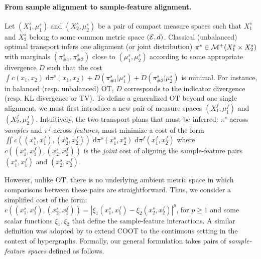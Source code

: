 \paragraph{From sample alignment to sample-feature alignment.}
Let $(X_1^s, \mu_1^s)$ and $(X_2^s, \mu_2^s)$ be a pair of compact measure spaces such that
$X_1^s$ and $X_2^s$ belong to some common metric space $(\mathcal E, d)$.
Classical (unbalanced) optimal transport infers one alignment (or joint distribution)
$\pi^s \in \mathcal M^+(X_1^{s} \times X_2^s)$ with marginals $(\pi^{s}_{\#1}, \pi^{s}_{\#2})$
close to $(\mu_1^s, \mu_2^s)$ according to some appropriate divergence $D$ such that
the cost $\int c(x_1, x_2) \; \mathrm d\pi^{s}(x_1, x_2) + D(\pi^{s}_{\#1} | \mu_1^s)
+ D(\pi^{s}_{\#2} | \mu_2^s)$ is minimal. For instance, in balanced (resp. unbalanced) OT,
$D$ corresponds to the indicator divergence (resp. KL divergence or TV).
To define a generalized OT beyond one single alignment, we must first introduce
a new pair of measure spaces $(X_1^{f}, \mu_1^f)$ and $(X_2^{f}, \mu_2^f)$.
Intuitively,  the two transport plans that must be inferred: $\pi^s$ across \emph{samples}
and $\pi^f$ across \emph{features}, must minimize a cost of the form
$\iint c((x_1^s, x_1^f), (x_2^s, x_2^f)) \; \mathrm d\pi^s(x_1^s, x_2^s)\; \mathrm d \pi^f(x_1^f, x_2^f)$
where $c((x_1^s, x_1^f), (x_2^s, x_2^f))$ is the \emph{joint} cost of aligning
the sample-feature pairs $(x_1^s, x_1^f)$ and $(x_2^s, x_2^f)$.

However, unlike OT,
there is no underlying ambient metric space in which comparisons between these pairs
are straightforward. Thus, we consider a simplified cost of the form:
$c((x_1^s, x_1^f), (x_2^s, x_2^f)) = |\xi_1(x_1^s, x_1^f) - \xi_2(x_2^s, x_2^f)|^p$, for $p \geq 1$
and some scalar functions $\xi_1, \xi_2$ that define the sample-feature interactions.
A similar definition was adopted by \citet{Chowdhury21b} to extend COOT to the continuous setting
in the context of hypergraphs. Formally, our general formulation takes
pairs of \emph{sample-feature spaces} defined as follows.

